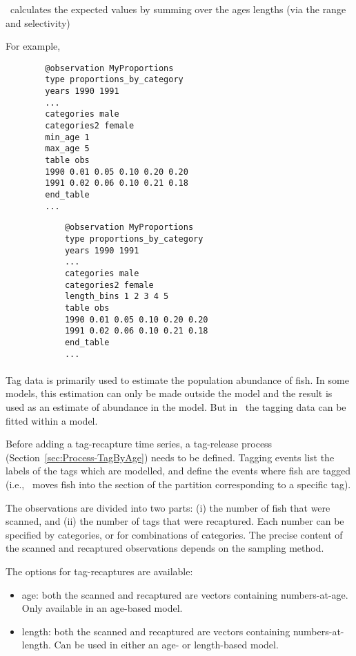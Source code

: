 \CNAME\ calculates the expected values by summing over the \ifAgeBased ages \else lengths \fi (via the range and selectivity)

For example,
\ifAgeBased
{\small{\begin{verbatim}
		@observation MyProportions
		type proportions_by_category
		years 1990 1991
		...
		categories male
		categories2 female
		min_age 1
		max_age 5
		table obs
		1990 0.01 0.05 0.10 0.20 0.20
		1991 0.02 0.06 0.10 0.21 0.18
		end_table
		...
		\end{verbatim}}}
\else
{\small{\begin{verbatim}
			@observation MyProportions
			type proportions_by_category
			years 1990 1991
			...
			categories male
			categories2 female
			length_bins 1 2 3 4 5
			table obs
			1990 0.01 0.05 0.10 0.20 0.20
			1991 0.02 0.06 0.10 0.21 0.18
			end_table
			...
\end{verbatim}}}
\fi 

\ifAgeBased

\paragraph*{\label{sec:Observation-TagRecaptures}\label{sec:Observation-TagRecaptureByAge}\label{sec:Observation-TagRecaptureByLength}}

Tag data is primarily used to estimate the population abundance of fish. In some models, this estimation can only be made outside the model and the result is used as an estimate of abundance in the model. But in \CNAME\ the tagging data can be fitted within a model.

Before adding a tag-recapture time series, a tag-release process (Section~\ref{sec:Process-TagByAge}) needs to be defined. Tagging events list the labels of the tags which are modelled, and define the events where fish are tagged (i.e., \CNAME\ moves fish into the section of the partition corresponding to a specific tag).

The observations are divided into two parts: (i) the number of fish that were scanned, and (ii) the number of tags that were recaptured. Each number can be specified by categories, or for combinations of categories. The precise content of the scanned and recaptured observations depends on the sampling method.

The options for tag-recaptures are available:

\begin{itemize}
	\item age: both the scanned and recaptured are vectors containing numbers-at-age. Only available in an age-based model. 
	\item length: both the scanned and recaptured are vectors containing numbers-at-length. Can be used in either an age- or length-based model.
\end{itemize}

